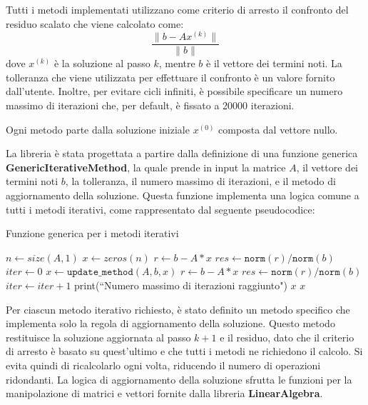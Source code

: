 Tutti i metodi implementati utilizzano come criterio di arresto il confronto del
residuo scalato che viene calcolato come:
\begin{equation}
    \frac{\|b - Ax^{(k)}\|}{\|b\|}
\end{equation}
dove $x^{(k)}$ è la soluzione al passo $k$, mentre $b$ è il vettore dei termini
noti. La tolleranza che viene utilizzata per effettuare il confronto è un valore
fornito dall'utente. Inoltre, per evitare cicli infiniti, è possibile specificare
un numero massimo di iterazioni che, per default, è fissato a 20000 iterazioni.

Ogni metodo parte dalla soluzione iniziale $x^{(0)}$ composta dal vettore nullo.

La libreria è stata progettata a partire dalla definizione di una funzione generica
\textbf{GenericIterativeMethod}, la quale prende in input la matrice $A$, il
vettore dei termini noti $b$, la tolleranza, il numero massimo di iterazioni, e
il metodo di aggiornamento della soluzione. Questa funzione implementa una logica
comune a tutti i metodi iterativi, come rappresentato dal seguente pseudocodice:
\begin{algorithm}
    \caption{Funzione generica per i metodi iterativi}\label{alg:iterative}
    \begin{algorithmic}
        \State $n \gets size(A, 1)$
        \State $x \gets zeros(n)$
        \State $r \gets b - A * x$
        \State $res \gets \texttt{norm}(r) / \texttt{norm}(b)$
        \State $iter \gets 0$
        \State $x \gets \texttt{update\_method}(A, b, x)$
        \State $r \gets b - A * x$
        \State $res \gets \texttt{norm}(r) / \texttt{norm}(b)$
        \State $iter \gets iter + 1$
        \State print(``Numero massimo di iterazioni raggiunto")
        \State \Return $x$
        \EndIf
        \EndWhile
        \State \Return $x$
        \EndFunction
    \end{algorithmic}
\end{algorithm}

Per ciascun metodo iterativo richiesto, è stato definito un metodo specifico che
implementa solo la regola di aggiornamento della soluzione. Questo metodo restituisce
la soluzione aggiornata al passo $k+1$ e il residuo, dato che il criterio di
arresto è basato su quest'ultimo e che tutti i metodi ne richiedono il calcolo.
Si evita quindi di ricalcolarlo ogni volta, riducendo il numero di operazioni
ridondanti. La logica di aggiornamento della soluzione sfrutta le funzioni per
la manipolazione di matrici e vettori fornite dalla libreria \textbf{LinearAlgebra}.

